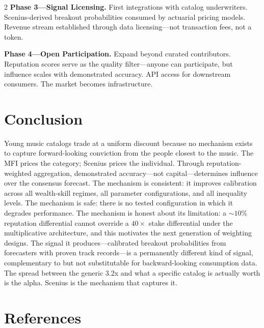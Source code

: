 \documentclass[9pt,oneside]{amsart}
\begin{document}
\begin{multicols}{2}
\textbf{Phase 3---Signal Licensing.} First integrations with catalog underwriters. Scenius-derived breakout probabilities consumed by actuarial pricing models. Revenue stream established through data licensing---not transaction fees, not a token.

\textbf{Phase 4---Open Participation.} Expand beyond curated contributors. Reputation scores serve as the quality filter---anyone can participate, but influence scales with demonstrated accuracy. API access for downstream consumers. The market becomes infrastructure.

\section{Conclusion}

Young music catalogs trade at a uniform discount because no mechanism exists to capture forward-looking conviction from the people closest to the music. The MFI prices the category; Scenius prices the individual. Through reputation-weighted aggregation, demonstrated accuracy---not capital---determines influence over the consensus forecast. The mechanism is consistent: it improves calibration across all wealth-skill regimes, all parameter configurations, and all inequality levels. The mechanism is safe: there is no tested configuration in which it degrades performance. The mechanism is honest about its limitation: a ${\sim}10\%$ reputation differential cannot override a $40\times$ stake differential under the multiplicative architecture, and this motivates the next generation of weighting designs. The signal it produces---calibrated breakout probabilities from forecasters with proven track records---is a permanently different kind of signal, complementary to but not substitutable for backward-looking consumption data. The spread between the generic 3.2x and what a specific catalog is actually worth is the alpha. Scenius is the mechanism that captures it.

\end{multicols}


\section*{References}
\end{document}
